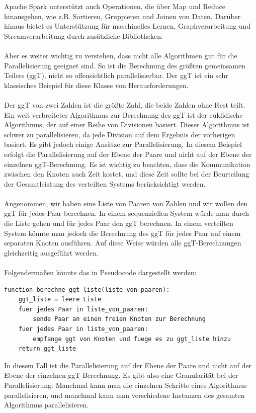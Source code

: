 Apache Spark unterstützt auch Operationen, die über Map und Reduce hinausgehen, wie z.B. Sortieren, Gruppieren und Joinen von Daten. Darüber hinaus bietet es Unterstützung für maschinelles Lernen, Graphverarbeitung und Streamverarbeitung durch zusätzliche Bibliotheken.
\\\\
Aber es weiter wichtig zu verstehen, dass nicht alle Algorithmen gut für die Parallelisierung geeignet sind.  So ist die Berechnung des größten gemeinsamen Teilers (ggT), nicht so offensichtlich parallelisierbar. Der ggT ist ein sehr klassisches Beispiel für diese Klasse von Herausforderungen.
\\\\
Der ggT von zwei Zahlen ist die größte Zahl, die beide Zahlen ohne Rest teilt. Ein weit verbreiteter Algorithmus zur Berechnung des ggT ist der euklidische Algorithmus, der auf einer Reihe von Divisionen basiert. Dieser Algorithmus ist schwer zu parallelisieren, da jede Division auf dem Ergebnis der vorherigen basiert. Es gibt jedoch einige Ansätze zur Parallelisierung. In diesem Beispiel erfolgt die Parallelisierung auf der Ebene der Paare und nicht auf der Ebene der einzelnen ggT-Berechnung. Es ist wichtig zu beachten, dass die Kommunikation zwischen den Knoten auch Zeit kostet, und diese Zeit sollte bei der Beurteilung der Gesamtleistung des verteilten Systems berücksichtigt werden.
\\\\
Angenommen, wir haben eine Liste von Paaren von Zahlen und wir wollen den ggT für jedes Paar berechnen. In einem sequenziellen System würde man durch die Liste gehen und für jedes Paar den ggT berechnen. In einem verteilten System könnte man jedoch die Berechnung des ggT für jedes Paar auf einem separaten Knoten ausführen. Auf diese Weise würden alle ggT-Berechnungen gleichzeitig ausgeführt werden.
\\\\
Folgendermaßen könnte das in Pseudocode dargestellt werden:
\begin{lstlisting}[caption={ggT},captionpos=b,label={lst:ggt}]
function berechne_ggt_liste(liste_von_paaren):
    ggt_liste = leere Liste
    fuer jedes Paar in liste_von_paaren:
        sende Paar an einen freien Knoten zur Berechnung
    fuer jedes Paar in liste_von_paaren:
        empfange ggt von Knoten und fuege es zu ggt_liste hinzu
    return ggt_liste
\end{lstlisting}
In diesem Fall ist die Parallelisierung auf der Ebene der Paare und nicht auf der Ebene der einzelnen ggT-Berechnung. Es gibt also eine Granularität bei der Parallelisierung: Manchmal kann man die einzelnen Schritte eines Algorithmus parallelisieren, und manchmal kann man verschiedene Instanzen des gesamten Algorithmus parallelisieren.
